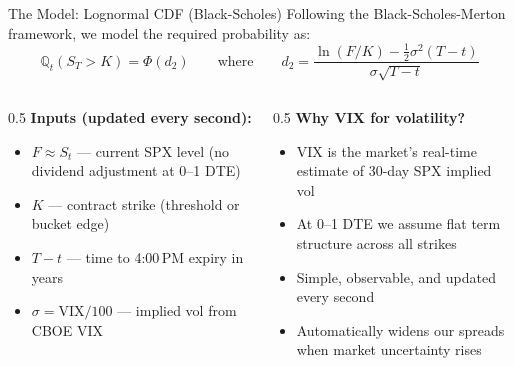 \documentclass[aspectratio=169]{beamer}
\begin{document}
\begin{frame}{The Model: Lognormal CDF (Black-Scholes)}
  Following the Black-Scholes-Merton framework, we model the required probability as:
  \[
    \mathbb{Q}_t(S_T > K) = \Phi(d_2) \qquad \text{where} \qquad
    d_2 = \frac{\ln(F/K) - \tfrac{1}{2}\sigma^2(T-t)}{\sigma\sqrt{T-t}}
  \]
  \begin{columns}[T]
    \begin{column}{0.5\textwidth}
      \textbf{Inputs (updated every second):}
      \begin{itemize}\small
        \item $F \approx S_t$ --- current SPX level (no dividend adjustment at 0--1 DTE)
        \item $K$ --- contract strike (threshold or bucket edge)
        \item $T - t$ --- time to 4:00\,PM expiry in years
        \item $\sigma = \text{VIX}/100$ --- implied vol from CBOE VIX
      \end{itemize}
    \end{column}
    \begin{column}{0.5\textwidth}
      \textbf{Why VIX for volatility?}
      \begin{itemize}\small
        \item VIX is the market's real-time estimate of 30-day SPX implied vol
        \item At 0--1 DTE we assume flat term structure across all strikes
        \item Simple, observable, and updated every second
        \item Automatically widens our spreads when market uncertainty rises
      \end{itemize}
    \end{column}
  \end{columns}
\end{frame}
\end{document}

